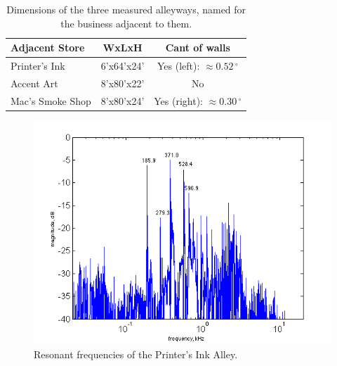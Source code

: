 \documentclass{aes137}
\renewcommand{\deg}{\,^{\circ}}
\begin{document}
\begin{center} \begin{table}[h!]
\footnotesize
\begin{tabular}{|l|c|c|}
\hline
\textbf{Adjacent Store} & \textbf{WxLxH} & \textbf{Cant of walls} \\
\hline
Printer's Ink & 6'x64'x24' & Yes (left): $\approx0.52\deg$ \\
\hline
Accent Art & 8'x80'x22' & No \\
\hline
Mac's Smoke Shop & 8'x80'x24' & Yes (right): $\approx0.30\deg$ \\
\hline
\end{tabular} \caption{Dimensions of the three measured alleyways, named for the business adjacent to them.} \end{table}
\normalsize
\end{center}


\begin{figure}[h!] \centering \includegraphics[width=\linewidth]{images/printers_labeled_IR.png} \caption{Resonant frequencies of the Printer's Ink Alley.} \end{figure}
\end{document}
